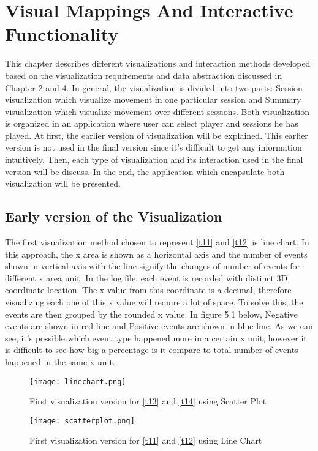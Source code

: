\chapter{Visual Mappings And Interactive Functionality}
This chapter describes different visualizations and interaction methods developed based on the visualization requirements and data abstraction discussed in Chapter 2 and 4. In general, the visualization is divided into two parts: Session visualization which visualize movement in one particular session and Summary visualization which visualize movement over different sessions. Both visualization is organized in an application where user can select player and sessions he has played. At first, the earlier version of visualization will be explained. This earlier version is not used in the final version since it's difficult to get any information intuitively. Then, each type of visualization and its interaction used in the final version will be discuss. In the end, the application which encapsulate both visualization will be presented.

\section{Early version of the Visualization}
The first visualization method chosen to represent \ref{t11} and \ref{t12} is line chart. In this approach, the x area is shown as a horizontal axis and the number of events shown in vertical axis with the line signify the changes of number of events for different x area unit. In the log file, each event is recorded with distinct 3D coordinate location. The x value from this coordinate is a decimal, therefore visualizing each one of this x value will require a lot of space. To solve this, the events are then grouped by the rounded x value. In figure 5.1 below, Negative events are shown in red line and Positive events are shown in blue line. As we can see, it's possible which event type happened more in a certain x unit, however it is difficult to see how big a percentage is it compare to total number of events happened in the same x unit.

\begin{figure}
\centering
\texttt{[image: linechart.png]}
\caption{First visualization version for \ref{t13} and \ref{t14} using Scatter Plot}
\end{figure}

\begin{figure}
\centering
\texttt{[image: scatterplot.png]}
\caption{First visualization version for \ref{t11} and \ref{t12} using Line Chart}
\end{figure}

